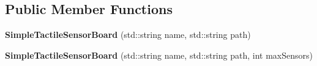 \subsection*{Public Member Functions}
\begin{DoxyCompactItemize}
\item 
\hypertarget{classdrobot_1_1device_1_1tactile_1_1SimpleTactileSensorBoard_a22778b1f5cdba96f49875a0e92c6e2f7}{{\bfseries Simple\-Tactile\-Sensor\-Board} (std\-::string name, std\-::string path)}\label{classdrobot_1_1device_1_1tactile_1_1SimpleTactileSensorBoard_a22778b1f5cdba96f49875a0e92c6e2f7}

\item 
\hypertarget{classdrobot_1_1device_1_1tactile_1_1SimpleTactileSensorBoard_a3e1d250aaa890d6e35ae1dd79397216c}{{\bfseries Simple\-Tactile\-Sensor\-Board} (std\-::string name, std\-::string path, int max\-Sensors)}\label{classdrobot_1_1device_1_1tactile_1_1SimpleTactileSensorBoard_a3e1d250aaa890d6e35ae1dd79397216c}


\end{DoxyCompactItemize}
